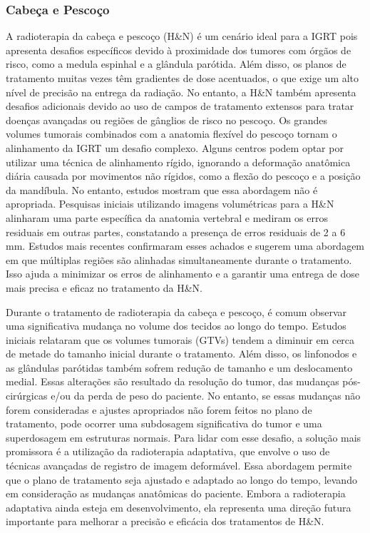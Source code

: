 \documentclass[11pt,a4paper]{article}
\begin{document}
\subsubsection*{Cabeça e Pescoço}

	A radioterapia da cabeça e pescoço (H\&N) é um cenário ideal para a IGRT pois apresenta desafios específicos devido à proximidade dos tumores com órgãos de risco, como a medula espinhal e a glândula parótida. Além disso, os planos de tratamento muitas vezes têm gradientes de dose acentuados, o que exige um alto nível de precisão na entrega da radiação. No entanto, a H\&N também apresenta desafios adicionais devido ao uso de campos de tratamento extensos para tratar doenças avançadas ou regiões de gânglios de risco no pescoço. Os grandes volumes tumorais combinados com a anatomia flexível do pescoço tornam o alinhamento da IGRT um desafio complexo. Alguns centros podem optar por utilizar uma técnica de alinhamento rígido, ignorando a deformação anatômica diária causada por movimentos não rígidos, como a flexão do pescoço e a posição da mandíbula. No entanto, estudos mostram que essa abordagem não é apropriada. Pesquisas iniciais utilizando imagens volumétricas para a H\&N alinharam uma parte específica da anatomia vertebral e mediram os erros residuais em outras partes, constatando a presença de erros residuais de 2 a 6 mm. Estudos mais recentes confirmaram esses achados e sugerem uma abordagem em que múltiplas regiões são alinhadas simultaneamente durante o tratamento. Isso ajuda a minimizar os erros de alinhamento e a garantir uma entrega de dose mais precisa e eficaz no tratamento da H\&N.

	Durante o tratamento de radioterapia da cabeça e pescoço, é comum observar uma significativa mudança no volume dos tecidos ao longo do tempo. Estudos iniciais relataram que os volumes tumorais (GTVs) tendem a diminuir em cerca de metade do tamanho inicial durante o tratamento. Além disso, os linfonodos e as glândulas parótidas também sofrem redução de tamanho e um deslocamento medial. Essas alterações são resultado da resolução do tumor, das mudanças pós-cirúrgicas e/ou da perda de peso do paciente. No entanto, se essas mudanças não forem consideradas e ajustes apropriados não forem feitos no plano de tratamento, pode ocorrer uma subdosagem significativa do tumor e uma superdosagem em estruturas normais. Para lidar com esse desafio, a solução mais promissora é a utilização da radioterapia adaptativa, que envolve o uso de técnicas avançadas de registro de imagem deformável. Essa abordagem permite que o plano de tratamento seja ajustado e adaptado ao longo do tempo, levando em consideração as mudanças anatômicas do paciente. Embora a radioterapia adaptativa ainda esteja em desenvolvimento, ela representa uma direção futura importante para melhorar a precisão e eficácia dos tratamentos de H\&N.
\end{document}
